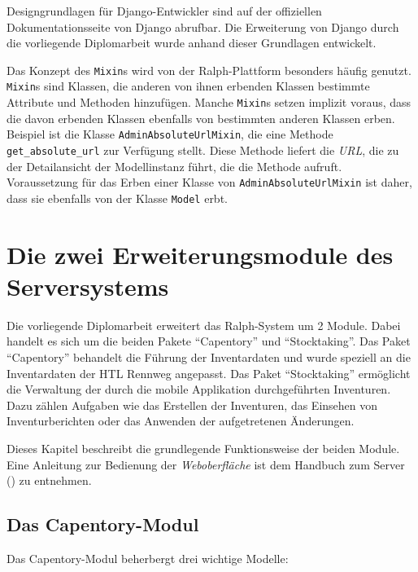 Designgrundlagen für Django-Entwickler sind auf der offiziellen
Dokumentationsseite von Django \cite{django-doku-coding-style} abrufbar.
Die Erweiterung von Django durch die vorliegende Diplomarbeit wurde
anhand dieser Grundlagen entwickelt.

Das Konzept des \texttt{Mixin}s wird von der Ralph-Plattform besonders
häufig genutzt. \texttt{Mixin}s sind Klassen, die anderen von ihnen
erbenden Klassen bestimmte Attribute und Methoden hinzufügen. Manche
\texttt{Mixin}s setzen implizit voraus, dass die davon erbenden Klassen
ebenfalls von bestimmten anderen Klassen erben. Beispiel ist die Klasse
\texttt{AdminAbsoluteUrlMixin}, die eine Methode
\texttt{get\_absolute\_url} zur Verfügung stellt. Diese Methode liefert
die \emph{URL}, die zu
der Detailansicht der Modellinstanz führt, die die Methode aufruft.
Voraussetzung für das Erben einer Klasse von
\texttt{AdminAbsoluteUrlMixin} ist daher, dass sie ebenfalls von der
Klasse \texttt{Model} erbt.

\chapter{Die zwei Erweiterungsmodule des Serversystems}
\label{die_zwei_module}

Die vorliegende Diplomarbeit erweitert das Ralph-System um 2 Module.
Dabei handelt es sich um die beiden Pakete ``Capentory'' und
``Stocktaking''. Das Paket ``Capentory'' behandelt die Führung der
Inventardaten und wurde speziell an die Inventardaten der HTL Rennweg
angepasst. Das Paket ``Stocktaking'' ermöglicht die Verwaltung der durch
die mobile Applikation durchgeführten Inventuren. Dazu zählen Aufgaben
wie das Erstellen der Inventuren, das Einsehen von Inventurberichten
oder das Anwenden der aufgetretenen Änderungen.

Dieses Kapitel beschreibt die grundlegende Funktionsweise der beiden
Module. Eine Anleitung zur Bedienung der \emph{Weboberfläche}
ist dem Handbuch zum Server () zu entnehmen.

\hypertarget{das-capentory-modul}{%
\section{Das Capentory-Modul}\label{das-capentory-modul}}

Das Capentory-Modul beherbergt drei wichtige Modelle:

